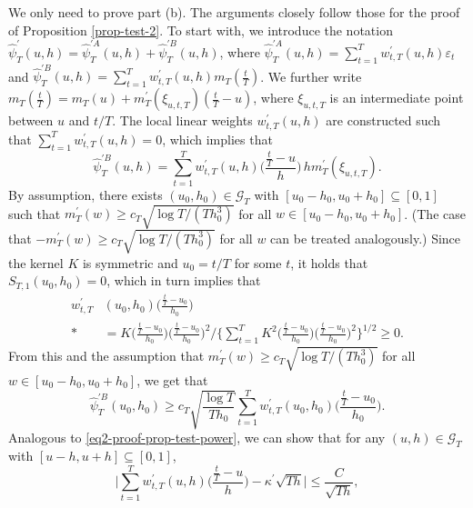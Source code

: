\documentclass[a4paper,12pt]{article}
\begin{document}
We only need to prove part (b). The arguments closely follow those for the proof of Proposition \ref{prop-test-2}. To start with, we introduce the notation $\widehat{\psi}_T^\prime(u,h) = \widehat{\psi}_T^{\prime A}(u,h) + \widehat{\psi}_T^{\prime B}(u,h)$, where $\widehat{\psi}_T^{\prime A}(u,h) = \sum\nolimits_{t=1}^T w_{t,T}^\prime(u,h) \varepsilon_t$ and $\widehat{\psi}_T^{\prime B}(u,h) = \sum\nolimits_{t=1}^T w_{t,T}^\prime(u,h) m_T(\frac{t}{T})$. We further write $m_T(\frac{t}{T}) = m_T(u) + m_T^\prime(\xi_{u,t,T})(\frac{t}{T} - u)$, where $\xi_{u,t,T}$ is an intermediate point between $u$ and $t/T$. The local linear weights $w_{t,T}^\prime(u,h)$ are constructed such that $\sum\nolimits_{t=1}^T w_{t,T}^\prime(u,h) = 0$, which implies that 
\begin{equation}\label{eq1-proof-prop-test-shape-power}
\widehat{\psi}_T^{\prime B}(u,h) = \sum\limits_{t=1}^T w_{t,T}^\prime(u,h) \Big( \frac{\frac{t}{T} - u}{h} \Big) \, h m_T^\prime(\xi_{u,t,T}).
\end{equation}
By assumption, there exists $(u_0,h_0) \in \mathcal{G}_T$ with $[u_0-h_0,u_0+h_0] \subseteq [0,1]$ such that $m_T^\prime(w) \ge c_T \sqrt{\log T/(Th_0^3)}$ for all $w \in [u_0-h_0,u_0+h_0]$. (The case that $-m_T^\prime(w) \ge c_T \sqrt{\log T/(Th_0^3)}$ for all $w$ can be treated analogously.) Since the kernel $K$ is symmetric and $u_0 = t/T$ for some $t$, it holds that $S_{T,1}(u_0,h_0) = 0$, which in turn implies that 
\begin{align*}
w_{t,T}^\prime & (u_0,h_0) \Big( \frac{\frac{t}{T} - u_0}{h_0} \Big) \\* & = K\Big(\frac{\frac{t}{T}-u_0}{h_0}\Big) \Big( \frac{\frac{t}{T} - u_0}{h_0} \Big)^2 \Big/ \Big\{ \sum_{t=1}^T K^2\Big(\frac{\frac{t}{T}-u_0}{h_0}\Big) \Big( \frac{\frac{t}{T} - u_0}{h_0} \Big)^2 \Big\}^{1/2} \ge 0. 
\end{align*}
From this and the assumption that $m_T^\prime(w) \ge c_T \sqrt{\log T/(Th_0^3)}$ for all $w \in [u_0-h_0,u_0+h_0]$, we get that 
\begin{equation}\label{eq2-proof-prop-test-shape-power}
\widehat{\psi}_T^{\prime B}(u_0,h_0) \ge c_T \sqrt{\frac{\log T}{T h_0}} \sum\limits_{t=1}^T w_{t,T}^\prime(u_0,h_0) \Big( \frac{\frac{t}{T} - u_0}{h_0} \Big).  
\end{equation}
Analogous to \eqref{eq2-proof-prop-test-power}, we can show that for any $(u,h) \in \mathcal{G}_T$ with $[u-h,u+h] \subseteq [0,1]$, 
\begin{equation}\label{eq3-proof-prop-test-shape-power}
\Big| \sum\limits_{t=1}^T w_{t,T}^\prime(u,h) \Big(\frac{\frac{t}{T} - u}{h}\Big) - \kappa^\prime \sqrt{Th} \Big| \le \frac{C}{\sqrt{Th}}, 
\end{equation}
\end{document}
